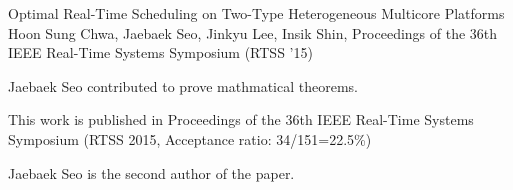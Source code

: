 \begin{cventries}
  \paperentry
    {Optimal Real-Time Scheduling on Two-Type Heterogeneous Multicore Platforms} %
    {Hoon Sung Chwa, Jaebaek Seo, Jinkyu Lee, Insik Shin,} %
    {Proceedings of the 36th IEEE Real-Time Systems Symposium (RTSS '15)} %
    {
        \begin{cvitems} %
        \item {Jaebaek Seo contributed to prove mathmatical theorems.}
        \item{This work is published in Proceedings of the 36th IEEE Real-Time
                Systems Symposium (RTSS 2015, Acceptance ratio: 34/151=22.5\%)}
            \item {Jaebaek Seo is the second author of the paper.}
            \end{cvitems}
    }

\end{cventries}
